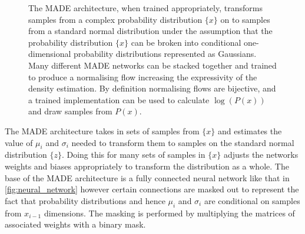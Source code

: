 \begin{figure}[h!]
    \caption{The MADE architecture, when trained appropriately, transforms samples from a complex probability distribution $\{x\}$ on to samples from a standard normal distribution under the assumption that the probability distribution $\{x\}$ can be broken into conditional one-dimensional probability distributions represented as Gaussians. Many different MADE networks can be stacked together and trained to produce a normalising flow increasing the expressivity of the density estimation. By definition normalising flows are bijective, and a trained implementation can be used to calculate $\log(P(x))$ and draw samples from $P(x)$.}
    \label{fig:maf}
\end{figure}

The MADE architecture takes in sets of samples from $\{x\}$ and estimates the value of $\mu_i$ and $\sigma_i$ needed to transform them to samples on the standard normal distribution $\{z\}$. Doing this for many sets of samples in $\{x\}$ adjusts the networks weights and biases appropriately to transform the distribution as a whole. The base of the MADE architecture is a fully connected neural network like that in \cref{fig:neural_network} however certain connections are masked out to represent the fact that probability distributions and hence $\mu_i$ and $\sigma_i$ are conditional on samples from $x_{i-1}$ dimensions. The masking is performed by multiplying the matrices of associated weights with a binary mask.

